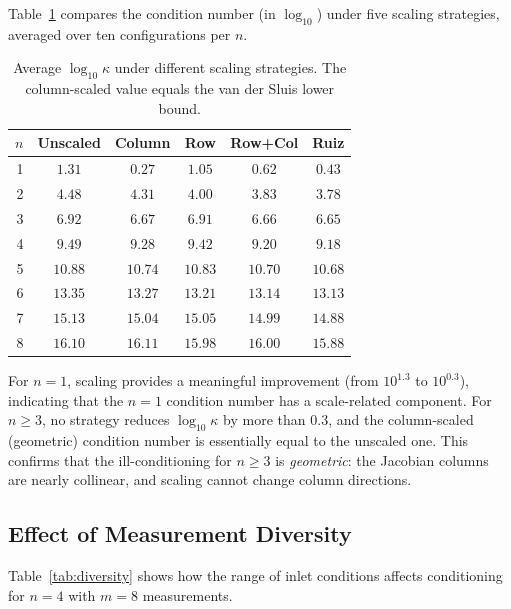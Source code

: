 Table~\ref{tab:scaling} compares the condition number (in $\log_{10}$) under five scaling strategies, averaged over ten configurations per $n$.

\begin{table}[htbp]
\centering
\caption{Average $\log_{10} \kappa$ under different scaling strategies. The column-scaled value equals the van der Sluis lower bound.}
\label{tab:scaling}
\begin{tabular}{r c c c c c}
\toprule
$n$ & Unscaled & Column & Row & Row+Col & Ruiz \\
\midrule
1 & $1.31$ & $0.27$ & $1.05$ & $0.62$ & $0.43$ \\
2 & $4.48$ & $4.31$ & $4.00$ & $3.83$ & $3.78$ \\
3 & $6.92$ & $6.67$ & $6.91$ & $6.66$ & $6.65$ \\
4 & $9.49$ & $9.28$ & $9.42$ & $9.20$ & $9.18$ \\
5 & $10.88$ & $10.74$ & $10.83$ & $10.70$ & $10.68$ \\
6 & $13.35$ & $13.27$ & $13.21$ & $13.14$ & $13.13$ \\
7 & $15.13$ & $15.04$ & $15.05$ & $14.99$ & $14.88$ \\
8 & $16.10$ & $16.11$ & $15.98$ & $16.00$ & $15.88$ \\
\bottomrule
\end{tabular}
\end{table}

For $n = 1$, scaling provides a meaningful improvement (from $10^{1.3}$ to $10^{0.3}$), indicating that the $n = 1$ condition number has a scale-related component.
For $n \geq 3$, no strategy reduces $\log_{10} \kappa$ by more than $0.3$, and the column-scaled (geometric) condition number is essentially equal to the unscaled one.
This confirms that the ill-conditioning for $n \geq 3$ is \emph{geometric}: the Jacobian columns are nearly collinear, and scaling cannot change column directions.


\subsection{Effect of Measurement Diversity}

Table~\ref{tab:diversity} shows how the range of inlet conditions affects conditioning for $n = 4$ with $m = 8$ measurements.

